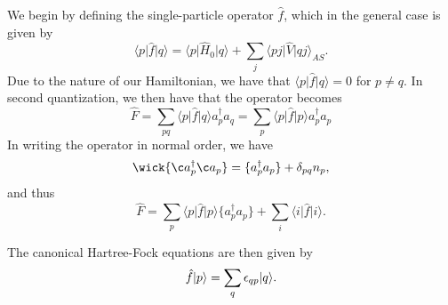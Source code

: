We begin by defining the single-particle operator $\hat{f}$, which in the general case is given by
\begin{equation*}
    \langle p \vert \hat{f} \vert q \rangle = \langle p \vert \hat{H}_0 \vert q \rangle + \sum_{j} \langle p j \vert \hat{V} \vert q j \rangle_{AS}.
\end{equation*}
Due to the nature of our Hamiltonian, we have that $\langle p \vert \hat{f} \vert q \rangle = 0$ for $p \neq q$.
In second quantization, we then have that the operator becomes
\begin{equation*}
    \hat{F}
    = \sum_{pq} \langle p \vert \hat{f} \vert q \rangle a_p^\dagger a_q
    = \sum_{p} \langle p \vert \hat{f} \vert p \rangle a_p^\dagger a_p
\end{equation*}
In writing the operator in normal order, we have
\begin{equation*}
    \wick{\c a_p^\dagger \c a_p} = \{ a_p^\dagger a_p \} + \delta_{pq} n_p,
\end{equation*}
and thus
\begin{equation*}
    \hat{F} = \sum_{p} \langle p \vert \hat{f} \vert p \rangle \{ a_p^\dagger a_p \} + \sum_{i} \langle i \vert \hat{f} \vert i \rangle.
\end{equation*}

The canonical Hartree-Fock equations are then given by
\begin{equation*}
    \hat{f} \lvert p\rangle = \sum_{q} \epsilon_{qp} \lvert q\rangle.
\end{equation*}
